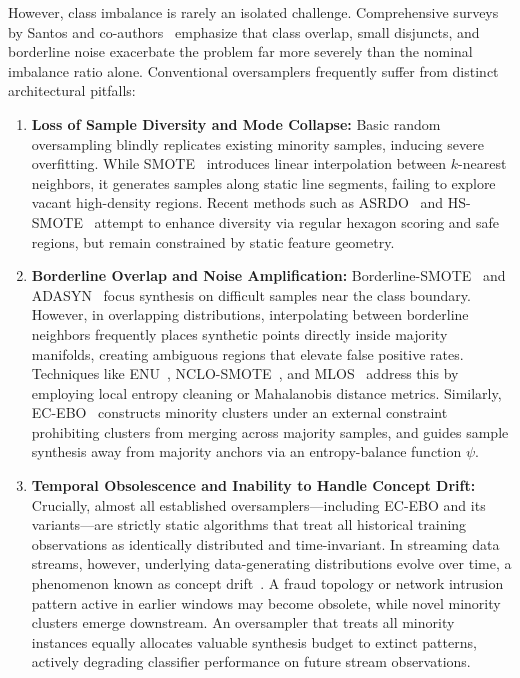 \documentclass[preprint,10pt]{elsarticle}
\begin{document}
However, class imbalance is rarely an isolated challenge. Comprehensive surveys by Santos and co-authors~\cite{santos2022,santos2023} emphasize that class overlap, small disjuncts, and borderline noise exacerbate the problem far more severely than the nominal imbalance ratio alone. Conventional oversamplers frequently suffer from distinct architectural pitfalls:
\begin{enumerate}[leftmargin=1.5em,label=(\roman*)]
\item \textbf{Loss of Sample Diversity and Mode Collapse:} Basic random oversampling blindly replicates existing minority samples, inducing severe overfitting. While SMOTE~\cite{chawla2002} introduces linear interpolation between $k$-nearest neighbors, it generates samples along static line segments, failing to explore vacant high-density regions. Recent methods such as ASRDO~\cite{tao2024} and HS-SMOTE~\cite{wang2025} attempt to enhance diversity via regular hexagon scoring and safe regions, but remain constrained by static feature geometry.
\item \textbf{Borderline Overlap and Noise Amplification:} Borderline-SMOTE~\cite{han2005} and ADASYN~\cite{he2008} focus synthesis on difficult samples near the class boundary. However, in overlapping distributions, interpolating between borderline neighbors frequently places synthetic points directly inside majority manifolds, creating ambiguous regions that elevate false positive rates. Techniques like ENU~\cite{kumar2024}, NCLO-SMOTE~\cite{tao2025}, and MLOS~\cite{yan2025b} address this by employing local entropy cleaning or Mahalanobis distance metrics. Similarly, EC-EBO~\cite{tao2026} constructs minority clusters under an external constraint prohibiting clusters from merging across majority samples, and guides sample synthesis away from majority anchors via an entropy-balance function $\psi$.
\item \textbf{Temporal Obsolescence and Inability to Handle Concept Drift:} Crucially, almost all established oversamplers—including EC-EBO and its variants—are strictly static algorithms that treat all historical training observations as identically distributed and time-invariant. In streaming data streams, however, underlying data-generating distributions evolve over time, a phenomenon known as concept drift~\cite{aguiar2023,korycki2021,abdullahi2025}. A fraud topology or network intrusion pattern active in earlier windows may become obsolete, while novel minority clusters emerge downstream. An oversampler that treats all minority instances equally allocates valuable synthesis budget to extinct patterns, actively degrading classifier performance on future stream observations.
\end{enumerate}
\end{document}
